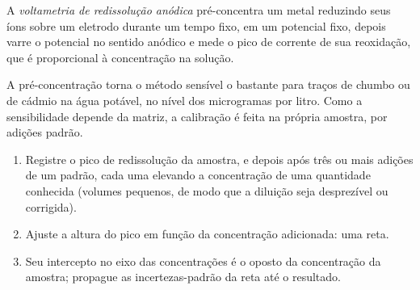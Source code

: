 \begin{definition}\label{def:b3:electrode-kinetics:stripping}
A \emph{voltametria de redissolução anódica}
pré-concentra um metal reduzindo seus íons sobre um eletrodo durante um tempo fixo,
em um potencial fixo, depois varre o potencial no sentido anódico e mede o pico de
corrente de sua reoxidação, que é proporcional à concentração na solução.
\end{definition}

A pré-concentração torna o método sensível o bastante para traços de chumbo ou de
cádmio na água potável, no nível dos microgramas por litro. Como a sensibilidade
depende da matriz, a calibração é feita na própria amostra, por adições padrão.

\begin{method}\label{met:b3:electrode-kinetics:standard-addition}
\begin{enumerate}
  \item Registre o pico de redissolução da amostra, e depois após três ou mais
        adições de um padrão, cada uma elevando a concentração de uma quantidade
        conhecida (volumes pequenos, de modo que a diluição seja desprezível ou corrigida).
  \item Ajuste a altura do pico em função da concentração adicionada: uma reta.
  \item Seu intercepto no eixo das concentrações é o oposto da concentração da
        amostra; propague as incertezas-padrão da reta até o resultado.
\end{enumerate}
\end{method}

